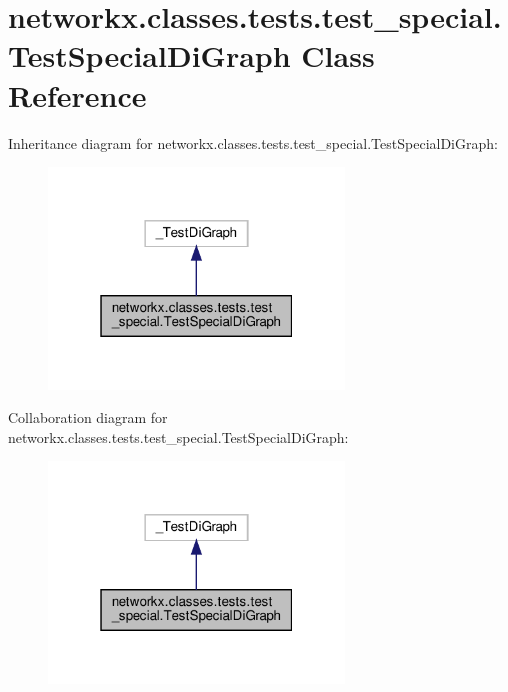 \hypertarget{classnetworkx_1_1classes_1_1tests_1_1test__special_1_1TestSpecialDiGraph}{}\section{networkx.\+classes.\+tests.\+test\+\_\+special.\+Test\+Special\+Di\+Graph Class Reference}
\label{classnetworkx_1_1classes_1_1tests_1_1test__special_1_1TestSpecialDiGraph}


Inheritance diagram for networkx.\+classes.\+tests.\+test\+\_\+special.\+Test\+Special\+Di\+Graph\+:
\nopagebreak
\begin{figure}[H]
\begin{center}
\leavevmode
\includegraphics[width=223pt]{classnetworkx_1_1classes_1_1tests_1_1test__special_1_1TestSpecialDiGraph__inherit__graph}
\end{center}
\end{figure}


Collaboration diagram for networkx.\+classes.\+tests.\+test\+\_\+special.\+Test\+Special\+Di\+Graph\+:
\nopagebreak
\begin{figure}[H]
\begin{center}
\leavevmode
\includegraphics[width=223pt]{classnetworkx_1_1classes_1_1tests_1_1test__special_1_1TestSpecialDiGraph__coll__graph}
\end{center}
\end{figure}
